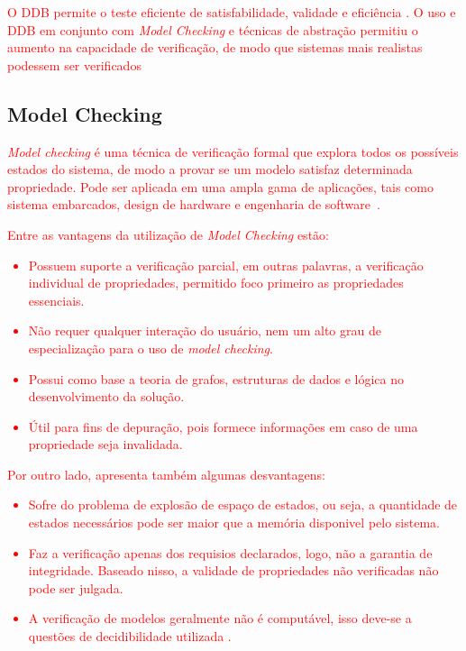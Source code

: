 \par
\textcolor{red}{O DDB permite o teste eficiente de satisfabilidade, validade e eficiência \cite{kropf2013introduction}. O uso e DDB em conjunto com \textit{Model Checking} e técnicas de abstração permitiu o aumento na capacidade de verificação, de modo que sistemas mais realistas podessem ser verificados\cite{biere2003bounded}}

\subsection{Model Checking}
\par
\textcolor{red}{\textit{Model checking} é uma técnica de verificação formal que explora todos os possíveis estados do sistema, de modo a provar se um modelo satisfaz determinada propriedade. Pode ser aplicada em uma ampla gama de aplicações, tais como sistema embarcados, design de hardware e engenharia de software~\cite{baier2008principles}.}

\par
\textcolor{red}{Entre as vantagens da utilização de \textit{Model Checking} estão:
\begin{itemize}
    \item Possuem suporte a verificação parcial, em outras palavras, a verificação individual de propriedades, permitido foco primeiro as propriedades essenciais\cite{baier2008principles}.
    \item Não requer qualquer interação do usuário, nem um alto grau de especialização para o uso de \textit{model checking}\cite{baier2008principles}.
    \item Possui como base a teoria de grafos, estruturas de dados e lógica no desenvolvimento da solução\cite{baier2008principles}.
    \item Útil para fins de depuração, pois formece informações em caso de uma propriedade seja invalidada\cite{baier2008principles}.
\end{itemize}}

\par
\textcolor{red}{Por outro lado, apresenta também algumas desvantagens:
\begin{itemize}
    \item Sofre do problema de explosão de espaço de estados, ou seja, a quantidade de estados necessários pode ser maior que a memória disponivel pelo sistema\cite{baier2008principles}.
    \item Faz a verificação apenas dos requisios declarados, logo, não a garantia de integridade. Baseado nisso, a validade de propriedades não verificadas não pode ser julgada\cite{baier2008principles}.
    \item A verificação de modelos geralmente não é computável,  isso deve-se a questões de decidibilidade utilizada \cite{baier2008principles}.
\end{itemize}}

